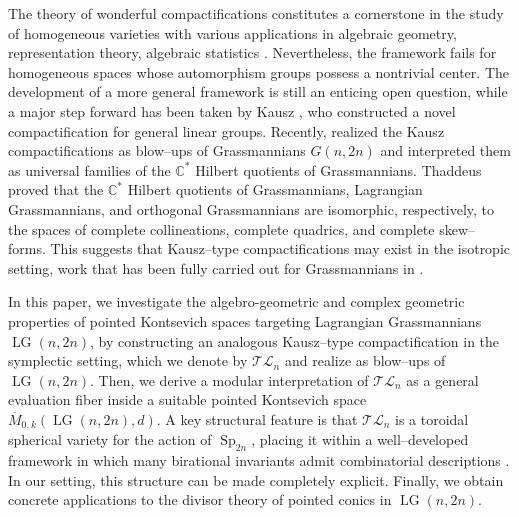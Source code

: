 \documentclass[10pt]{amsart}
\theoremstyle{definition}
\newcommand{\LG}{\operatorname{LG}}
\DeclareMathOperator{\Sp}{Sp}
\newcommand{\TL}{\mathcal{TL}}
\theoremstyle{plain} %
\begin{document}
The theory of wonderful compactifications constitutes a cornerstone in the study of homogeneous varieties with various applications in algebraic geometry, representation theory, algebraic statistics \cite{Fa,Sp1,Lu2,DKKS,MMM}. Nevertheless, the framework fails for homogeneous spaces whose automorphism groups possess a nontrivial center.  The development of a more general framework is still an enticing open question, while a major step forward has been taken by Kausz \cite{Ka}, who constructed a novel compactification for general linear groups. Recently, \cite{FW} realized the Kausz compactifications as blow--ups of Grassmannians $G(n,2n)$ and interpreted them as universal families of the $\mathbb C^*$ Hilbert quotients of  Grassmannians. Thaddeus \cite{Th1} proved that the $\mathbb C^*$ Hilbert quotients of Grassmannians, Lagrangian Grassmannians, and orthogonal Grassmannians are isomorphic, respectively, to the spaces of complete collineations, complete quadrics, and complete skew--forms. This suggests that Kausz--type compactifications may exist in the isotropic setting, work that has been fully carried out for Grassmannians in \cite{FW}.  %

In this paper, we investigate the algebro-geometric and complex geometric properties of pointed Kontsevich spaces targeting Lagrangian Grassmannians $\LG(n,2n)$, by constructing an analogous Kausz--type compactification in the symplectic setting, which we denote by $\TL_n$ and realize as blow--ups of $\LG(n,2n)$. %
Then, we derive a modular interpretation of $\TL_n$ as a general evaluation fiber inside a suitable pointed Kontsevich space $\overline{M}_{0,k}(\LG(n,2n),d)$. A key structural feature is that $\TL_n$ is a toroidal spherical variety for the action of $\Sp_{2n}$, placing it within a well--developed framework in which many birational invariants admit combinatorial descriptions \cite{BrionIntro,BrionSpherical,Br93}. In our setting, this structure can be made completely explicit. Finally, we obtain concrete applications to the divisor theory of pointed conics in $\LG(n,2n)$.
\smallskip
\end{document}

